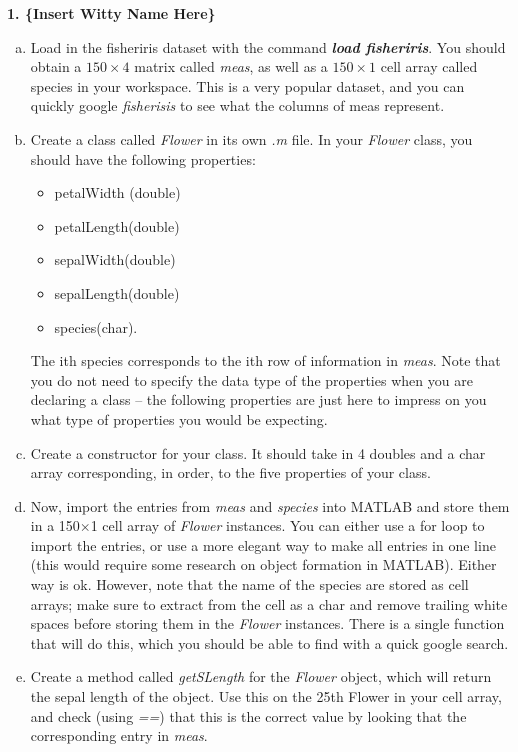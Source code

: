 \documentclass[11pt]{article}
\begin{document}
\noindent
\newline
\textbf{1. \{Insert Witty Name Here\}}
\begin{enumerate}[a.]
	\item  Load in the fisheriris dataset with the command \textbf{\textit{load fisheriris}}.
	You should obtain a $150 \times 4$ matrix called \textit{meas},
	as well as a $150 \times 1$ cell array called species in your workspace.
	This is a very popular dataset, 
	and you can quickly google \textit{fisherisis} to see what the columns of meas represent. 

	\item Create a class called \textit{Flower} in its own \textit{.m} file.
	In your \textit{Flower} class, you should have the following properties:
	\begin{itemize} 
		\item petalWidth (double)
		\item petalLength(double)
		\item sepalWidth(double)
		\item sepalLength(double)
		\item species(char).
	\end{itemize}
	The ith species corresponds to the ith row of information in \textit{meas}.
	Note that you do not need to specify the data type of the properties when
	you are declaring a class – the following properties are just here to impress on you what
	type of properties you would be expecting. 
	
	\item Create a constructor for your class.
	It should take in 4 doubles and a char array corresponding, in order,
	to the five properties of your class.
	
	\item Now, import the entries from \textit{meas} and \textit{species} into MATLAB and
	store them in a 150$\times$1 cell array of \textit{Flower} instances.
	You can either use a for loop to import the entries,
	or use a more elegant way to make all entries in one line
	(this would require some research on object formation in MATLAB).
	Either way is ok.
	However, note that the name of the species are stored as cell arrays;
	make sure to extract from the cell as a char and remove trailing white spaces
	before storing them in the \textit{Flower} instances.
	There is a single function that will do this,
	which you should be able to find with a quick google search.

	\item Create a method called \textit{getSLength} for the \textit{Flower} object,
	which will return the sepal length of the object.
	Use this on the 25th Flower in your cell array, and check (using \textit{==})
	that this is the correct value by looking that the corresponding entry in \textit{meas}.
	

\end{enumerate}
\end{document}
